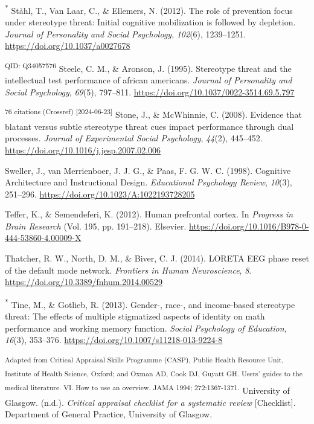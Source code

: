 \documentclass[
  stu, a4paper,floatsintext]{apa7}
\newlength{\cslhangindent}
\newenvironment{CSLReferences}[2] %
 {\begin{list}{}{%
  \setlength{\itemindent}{0pt}
  \setlength{\leftmargin}{0pt}
  \setlength{\parsep}{0pt}
  \ifodd #1
   \setlength{\leftmargin}{\cslhangindent}
   \setlength{\itemindent}{-1\cslhangindent}
  \fi
  \setlength{\itemsep}{#2\baselineskip}}}
 {\end{list}}
\begin{document}
\begin{CSLReferences}{1}{0}
\textsuperscript{*} Ståhl, T., Van Laar, C., \& Ellemers, N. (2012). The role of prevention focus under stereotype threat: {Initial} cognitive mobilization is followed by depletion. \emph{Journal of Personality and Social Psychology}, \emph{102}(6), 1239--1251. \url{https://doi.org/10.1037/a0027678}

\textsuperscript{QID: Q34057576} Steele, C. M., \& Aronson, J. (1995). Stereotype threat and the intellectual test performance of african americans. \emph{Journal of Personality and Social Psychology}, \emph{69}(5), 797--811. \url{https://doi.org/10.1037/0022-3514.69.5.797}

\textsuperscript{76 citations (Crossref) {[}2024-06-23{]}} Stone, J., \& McWhinnie, C. (2008). Evidence that blatant versus subtle stereotype threat cues impact performance through dual processes. \emph{Journal of Experimental Social Psychology}, \emph{44}(2), 445--452. \url{https://doi.org/10.1016/j.jesp.2007.02.006}

Sweller, J., van Merrienboer, J. J. G., \& Paas, F. G. W. C. (1998). Cognitive {Architecture} and {Instructional Design}. \emph{Educational Psychology Review}, \emph{10}(3), 251--296. \url{https://doi.org/10.1023/A:1022193728205}

Teffer, K., \& Semendeferi, K. (2012). Human prefrontal cortex. In \emph{Progress in {Brain Research}} (Vol. 195, pp. 191--218). Elsevier. \url{https://doi.org/10.1016/B978-0-444-53860-4.00009-X}

Thatcher, R. W., North, D. M., \& Biver, C. J. (2014). {LORETA EEG} phase reset of the default mode network. \emph{Frontiers in Human Neuroscience}, \emph{8}. \url{https://doi.org/10.3389/fnhum.2014.00529}

\textsuperscript{*} Tine, M., \& Gotlieb, R. (2013). Gender-, race-, and income-based stereotype threat: The effects of multiple stigmatized aspects of identity on math performance and working memory function. \emph{Social Psychology of Education}, \emph{16}(3), 353--376. \url{https://doi.org/10.1007/s11218-013-9224-8}

\textsuperscript{Adapted from Critical Appraisal Skills Programme (CASP), Public Health Resource Unit, Institute of Health Science, Oxford; and Oxman AD, Cook DJ, Guyatt GH. Users' guides to the medical literature. VI. How to use an overview. JAMA 1994; 272:1367-1371.} University of Glasgow. (n.d.). \emph{Critical appraisal checklist for a systematic review} {[}Checklist{]}. Department of General Practice, University of Glasgow.


\end{CSLReferences}
\end{document}
